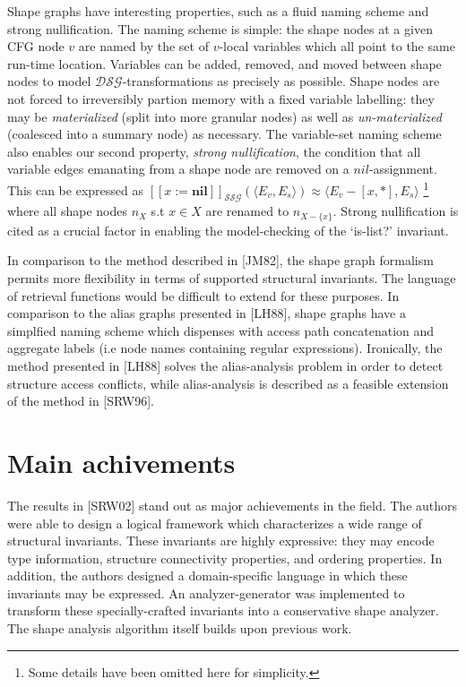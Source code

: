 \documentclass{article}
\begin{document}
Shape graphs have interesting properties, such as a fluid naming scheme and
strong nullification. The naming scheme is simple: the shape nodes at a
given CFG node $v$ are named by the set of $v$-local variables which all
point to the same run-time location.  Variables can be added, removed, and
moved between shape nodes to model $\mathcal{DSG}$-transformations as
precisely as possible. Shape nodes are not forced to irreversibly partion
memory with a fixed variable labelling: they may be \textit{materialized}
(split into more granular nodes) as well as \textit{un-materialized}
(coalesced into a summary node) as necessary.  The variable-set naming
scheme also enables our second property, \textit{strong nullification}, the
condition that all variable edges emanating from a shape node are removed on
a $nil$-assignment. This can be expressed as $[\![x :=
\textbf{nil}]\!]_{\mathcal{SSG}}(\langle E_v, E_s \rangle) \approx \langle
E_v - [x, *], E_s \rangle$ \footnote{Some details have been omitted here for
simplicity.} where all shape nodes $n_X$ s.t $x \in X$ are renamed to $n_{X
- \{x\}}$.  Strong nullification is cited as a crucial factor in enabling
the model-checking of the `is-list?' invariant.

In comparison to the method described in [JM82], the shape graph formalism
permits more flexibility in terms of supported structural invariants. The
language of retrieval functions would be difficult to extend for these
purposes. In comparison to the alias graphs presented in [LH88], shape
graphs have a simplfied naming scheme which dispenses with access path
concatenation and aggregate labels (i.e node names containing regular
expressions). Ironically, the method presented in [LH88] solves the
alias-analysis problem in order to detect structure access conflicts, while
alias-analysis is described as a feasible extension of the method in
[SRW96].

\section{Main achivements}

The results in [SRW02] stand out as major achievements in the field. The
authors were able to design a logical framework which characterizes a wide
range of structural invariants. These invariants are highly expressive: they
may encode type information, structure connectivity properties, and ordering
properties. In addition, the authors designed a domain-specific language in
which these invariants may be expressed. An analyzer-generator was
implemented to transform these specially-crafted invariants into a
conservative shape analyzer. The shape analysis algorithm itself builds upon
previous work.
\end{document}
